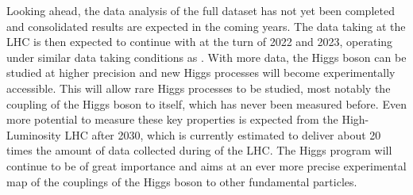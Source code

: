 Looking ahead, the data analysis of the full \RunTwo dataset has not yet been completed and consolidated results are expected in the coming years. The data taking at the LHC is then expected to continue with \RunThr at the turn of 2022 and 2023, operating under similar data taking conditions as \RunTwo. 
With more data, the Higgs boson can be studied at higher precision and new Higgs processes will become experimentally accessible. 
This will allow rare Higgs processes to be studied, most notably the coupling of the Higgs boson to itself, which has never been measured before.
Even more potential to measure these key properties is expected from the High-Luminosity LHC after 2030, which is currently estimated to deliver about 20 times the amount of data collected during \RunTwo of the LHC. 
The Higgs program will continue to be of great importance and aims at an ever more precise experimental map of the couplings of the Higgs boson to other fundamental particles. 

